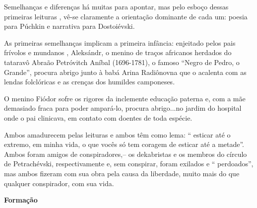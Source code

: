 Semelhanças e diferenças há muitas para apontar, mas pelo esboço dessas
primeiras leituras , vê-se claramente a orientação dominante de cada um:
poesia para Púchkin e narrativa para Dostoiévski.

As primeiras semelhanças implicam a primeira infância: enjeitado pelos
pais frívolos e mundanos , Aleksándr, o menino de traços africanos
herdados do tataravô Abraão Petróvitch Aníbal (1696-1781), o famoso
``Negro de Pedro, o Grande'', procura abrigo junto à babá Arina
Radiônovna que o acalenta com as lendas folclóricas e as crenças dos
humildes camponeses.

O menino Fiódor sofre os rigores da inclemente educação paterna e, com a
mãe demasiado fraca para poder ampará-lo, procura abrigo...no jardim do
hospital onde o pai clinicava, em contato com doentes de toda espécie.

Ambos amadurecem pelas leituras e ambos têm como lema: `` esticar até o
extremo, em minha vida, o que vocês só tem coragem de esticar até a
metade''. Ambos foram amigos de conspiradores,-- os dekabristas e os
membros do círculo de Petrachévski, respectivamente e, sem conspirar,
foram exilados e `` perdoados'', mas ambos fizeram com sua obra pela
causa da liberdade, muito mais do que qualquer conspirador, com sua
vida.

\textbf{Formação}

